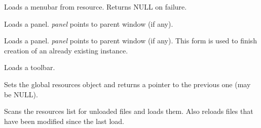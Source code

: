 
Loads a menubar from resource. Returns NULL on failure.

\label{wxxmlresourceloadpanel}


Loads a panel. {\it panel} points to parent window (if any).


Loads a panel. {\it panel} points to parent window (if any). This form
is used to finish creation of an already existing instance.

\label{wxxmlresourceloadtoolbar}


Loads a toolbar.

\label{wxxmlresourceset}


Sets the global resources object and returns a pointer to the previous one (may be NULL).

\label{wxxmlresourceupdateresources}


Scans the resources list for unloaded files and loads them. Also reloads
files that have been modified since the last load.

